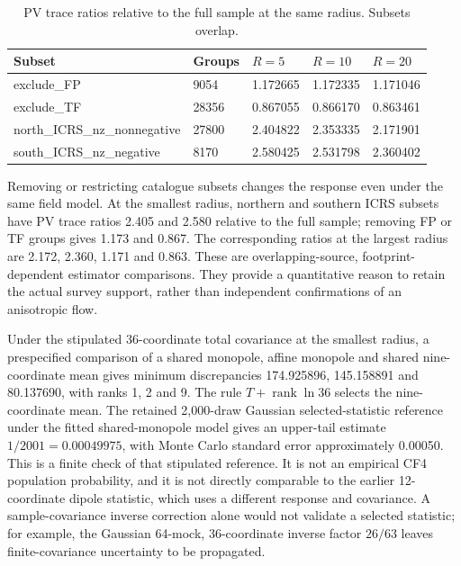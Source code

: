 \begin{table}[htbp]
\centering\small
\caption{PV trace ratios relative to the full sample at the same radius. Subsets overlap.}\label{tab:footprint}
\begin{tabular}{lllll}
\toprule
Subset & Groups & $R=5$ & $R=10$ & $R=20$ \\
\midrule
exclude\_FP & 9054 & 1.172665 & 1.172335 & 1.171046 \\
exclude\_TF & 28356 & 0.867055 & 0.866170 & 0.863461 \\
north\_ICRS\_nz\_nonnegative & 27800 & 2.404822 & 2.353335 & 2.171901 \\
south\_ICRS\_nz\_negative & 8170 & 2.580425 & 2.531798 & 2.360402 \\
\bottomrule
\end{tabular}
\end{table}

Removing or restricting catalogue subsets changes the response even
under the same field model. At the smallest radius, northern and
southern ICRS subsets have PV trace ratios 2.405 and 2.580 relative to
the full sample; removing FP or TF groups gives 1.173 and 0.867. The
corresponding ratios at the largest radius are 2.172, 2.360, 1.171 and
0.863. These are overlapping-source, footprint-dependent estimator
comparisons. They provide a quantitative reason to retain the actual
survey support, rather than independent confirmations of an anisotropic
flow.

Under the stipulated 36-coordinate total covariance at the smallest
radius, a prespecified comparison of a shared monopole, affine monopole
and shared nine-coordinate mean gives minimum discrepancies 174.925896,
145.158891 and 80.137690, with ranks 1, 2 and 9. The rule
\(T+\operatorname{rank}\ln36\) selects the nine-coordinate mean. The
retained 2,000-draw Gaussian selected-statistic reference under the
fitted shared-monopole model gives an upper-tail estimate
\(1/2001=0.00049975\), with Monte Carlo standard error approximately
0.00050. This is a finite check of that stipulated reference. It is not
an empirical CF4 population probability, and it is not directly
comparable to the earlier 12-coordinate dipole statistic, which uses a
different response and covariance. A sample-covariance inverse
correction alone would not validate a selected statistic; for example,
the Gaussian 64-mock, 36-coordinate inverse factor \(26/63\) leaves
finite-covariance uncertainty to be propagated.
